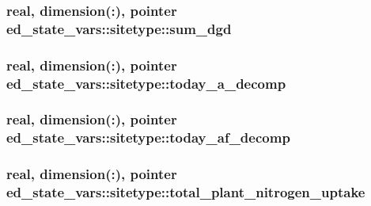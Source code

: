 \subsubsection[{\texorpdfstring{sum\+\_\+dgd}{sum_dgd}}]{\setlength{\rightskip}{0pt plus 5cm}real, dimension(\+:), pointer ed\+\_\+state\+\_\+vars\+::sitetype\+::sum\+\_\+dgd}\hypertarget{structed__state__vars_1_1sitetype_a3c83f6c2e2655ac33df743ed12e25609}{}\label{structed__state__vars_1_1sitetype_a3c83f6c2e2655ac33df743ed12e25609}
\subsubsection[{\texorpdfstring{today\+\_\+a\+\_\+decomp}{today_a_decomp}}]{\setlength{\rightskip}{0pt plus 5cm}real, dimension(\+:), pointer ed\+\_\+state\+\_\+vars\+::sitetype\+::today\+\_\+a\+\_\+decomp}\hypertarget{structed__state__vars_1_1sitetype_ab7df43a2fdea7cccaa811a8832c3a219}{}\label{structed__state__vars_1_1sitetype_ab7df43a2fdea7cccaa811a8832c3a219}
\subsubsection[{\texorpdfstring{today\+\_\+af\+\_\+decomp}{today_af_decomp}}]{\setlength{\rightskip}{0pt plus 5cm}real, dimension(\+:), pointer ed\+\_\+state\+\_\+vars\+::sitetype\+::today\+\_\+af\+\_\+decomp}\hypertarget{structed__state__vars_1_1sitetype_ad28e5bc4802147d0c687329d96659f3c}{}\label{structed__state__vars_1_1sitetype_ad28e5bc4802147d0c687329d96659f3c}
\subsubsection[{\texorpdfstring{total\+\_\+plant\+\_\+nitrogen\+\_\+uptake}{total_plant_nitrogen_uptake}}]{\setlength{\rightskip}{0pt plus 5cm}real, dimension(\+:), pointer ed\+\_\+state\+\_\+vars\+::sitetype\+::total\+\_\+plant\+\_\+nitrogen\+\_\+uptake}\hypertarget{structed__state__vars_1_1sitetype_a82b91babc2db9ff476240d27bc7d66f2}{}\label{structed__state__vars_1_1sitetype_a82b91babc2db9ff476240d27bc7d66f2}
